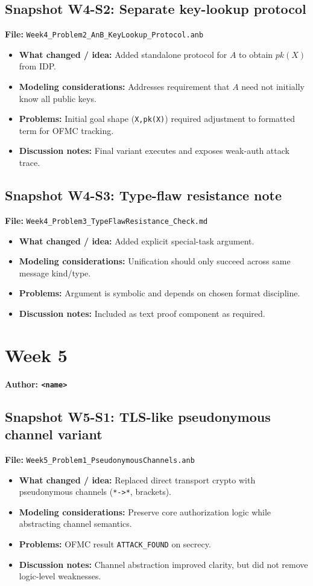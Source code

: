 \documentclass[11pt,a4paper]{article}
\begin{document}
\subsection*{Snapshot W4-S2: Separate key-lookup protocol}
\textbf{File:} \texttt{Week4\_Problem2\_AnB\_KeyLookup\_Protocol.anb}
\begin{itemize}[leftmargin=1.2em]
  \item \textbf{What changed / idea:} Added standalone protocol for $A$ to obtain $pk(X)$ from IDP.
  \item \textbf{Modeling considerations:} Addresses requirement that $A$ need not initially know all public keys.
  \item \textbf{Problems:} Initial goal shape (\texttt{X,pk(X)}) required adjustment to formatted term for OFMC tracking.
  \item \textbf{Discussion notes:} Final variant executes and exposes weak-auth attack trace.
\end{itemize}

\subsection*{Snapshot W4-S3: Type-flaw resistance note}
\textbf{File:} \texttt{Week4\_Problem3\_TypeFlawResistance\_Check.md}
\begin{itemize}[leftmargin=1.2em]
  \item \textbf{What changed / idea:} Added explicit special-task argument.
  \item \textbf{Modeling considerations:} Unification should only succeed across same message kind/type.
  \item \textbf{Problems:} Argument is symbolic and depends on chosen format discipline.
  \item \textbf{Discussion notes:} Included as text proof component as required.
\end{itemize}

\section{Week 5}
\textbf{Author: \texttt{<name>}}

\subsection*{Snapshot W5-S1: TLS-like pseudonymous channel variant}
\textbf{File:} \texttt{Week5\_Problem1\_PseudonymousChannels.anb}
\begin{itemize}[leftmargin=1.2em]
  \item \textbf{What changed / idea:} Replaced direct transport crypto with pseudonymous channels (\texttt{*->*}, brackets).
  \item \textbf{Modeling considerations:} Preserve core authorization logic while abstracting channel semantics.
  \item \textbf{Problems:} OFMC result \texttt{ATTACK\_FOUND} on secrecy.
  \item \textbf{Discussion notes:} Channel abstraction improved clarity, but did not remove logic-level weaknesses.
\end{itemize}
\end{document}
